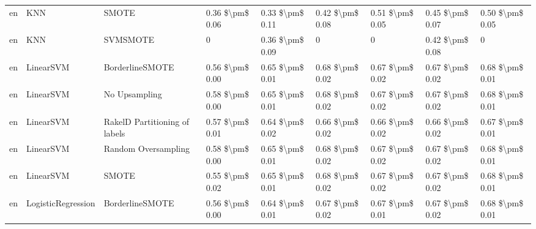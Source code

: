 \begin{tabular}{lllllllll}
      en &                             KNN &                         SMOTE & 0.36 \$\textbackslash pm\$ 0.06 &           0.33 \$\textbackslash pm\$ 0.11 &       0.42 \$\textbackslash pm\$ 0.08 &        0.51 \$\textbackslash pm\$ 0.05 &                         0.45 \$\textbackslash pm\$ 0.07 &     0.50 \$\textbackslash pm\$ 0.05 \\
      en &                             KNN &                      SVMSMOTE &               0 &           0.36 \$\textbackslash pm\$ 0.09 &                     0 &                      0 &                         0.42 \$\textbackslash pm\$ 0.08 &                   0 \\
      en &                       LinearSVM &               BorderlineSMOTE & 0.56 \$\textbackslash pm\$ 0.00 &           0.65 \$\textbackslash pm\$ 0.01 &       0.68 \$\textbackslash pm\$ 0.02 &        0.67 \$\textbackslash pm\$ 0.02 &                         0.67 \$\textbackslash pm\$ 0.02 &     0.68 \$\textbackslash pm\$ 0.01 \\
      en &                       LinearSVM &                 No Upsampling & 0.58 \$\textbackslash pm\$ 0.00 &           0.65 \$\textbackslash pm\$ 0.01 &       0.68 \$\textbackslash pm\$ 0.02 &        0.67 \$\textbackslash pm\$ 0.02 &                         0.67 \$\textbackslash pm\$ 0.02 &     0.68 \$\textbackslash pm\$ 0.01 \\
      en &                       LinearSVM & RakelD Partitioning of labels & 0.57 \$\textbackslash pm\$ 0.01 &           0.64 \$\textbackslash pm\$ 0.02 &       0.66 \$\textbackslash pm\$ 0.02 &        0.66 \$\textbackslash pm\$ 0.02 &                         0.66 \$\textbackslash pm\$ 0.02 &     0.67 \$\textbackslash pm\$ 0.01 \\
      en &                       LinearSVM &           Random Oversampling & 0.58 \$\textbackslash pm\$ 0.00 &           0.65 \$\textbackslash pm\$ 0.01 &       0.68 \$\textbackslash pm\$ 0.02 &        0.67 \$\textbackslash pm\$ 0.02 &                         0.67 \$\textbackslash pm\$ 0.02 &     0.68 \$\textbackslash pm\$ 0.01 \\
      en &                       LinearSVM &                         SMOTE & 0.55 \$\textbackslash pm\$ 0.02 &           0.65 \$\textbackslash pm\$ 0.01 &       0.68 \$\textbackslash pm\$ 0.02 &        0.67 \$\textbackslash pm\$ 0.02 &                         0.67 \$\textbackslash pm\$ 0.02 &     0.68 \$\textbackslash pm\$ 0.01 \\
      en &              LogisticRegression &               BorderlineSMOTE & 0.56 \$\textbackslash pm\$ 0.00 &           0.64 \$\textbackslash pm\$ 0.01 &       0.67 \$\textbackslash pm\$ 0.02 &        0.67 \$\textbackslash pm\$ 0.01 &                         0.67 \$\textbackslash pm\$ 0.02 &     0.68 \$\textbackslash pm\$ 0.01 \\

\end{tabular}
